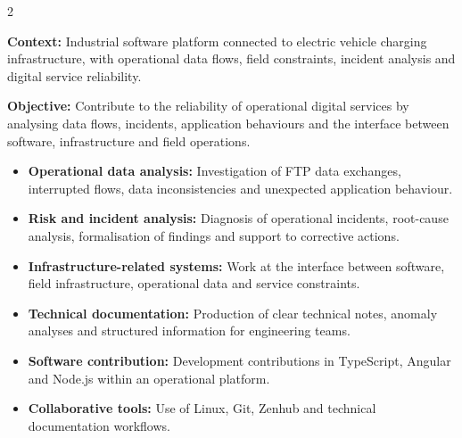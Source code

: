 \documentclass[8pt,a4paper,ragged2e,withhyper]{altacv}
\begin{document}



\makecvheader
\vspace{-0.3cm}


\begin{paracol}{2}



\textbf{Context:} Industrial software platform connected to electric vehicle charging infrastructure, with operational data flows, field constraints, incident analysis and digital service reliability.

\textbf{Objective:} Contribute to the reliability of operational digital services by analysing data flows, incidents, application behaviours and the interface between software, infrastructure and field operations.

\begin{itemize}
  \item \textbf{Operational data analysis:} Investigation of FTP data exchanges, interrupted flows, data inconsistencies and unexpected application behaviour.
  \item \textbf{Risk and incident analysis:} Diagnosis of operational incidents, root-cause analysis, formalisation of findings and support to corrective actions.
  \item \textbf{Infrastructure-related systems:} Work at the interface between software, field infrastructure, operational data and service constraints.
  \item \textbf{Technical documentation:} Production of clear technical notes, anomaly analyses and structured information for engineering teams.
  \item \textbf{Software contribution:} Development contributions in TypeScript, Angular and Node.js within an operational platform.
  \item \textbf{Collaborative tools:} Use of Linux, Git, Zenhub and technical documentation workflows.
\end{itemize}


\end{paracol}
\end{document}
